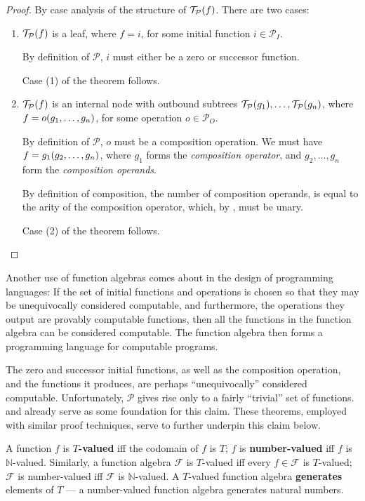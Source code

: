 \begin{proof} By case analysis of the structure of
$\mathcal{T}_\mathcal{P}{\mathopen{}\left({f}\right)\mathclose{}}$.  There are two
cases:\begin{enumerate}[label=(\arabic*)]

\item $\mathcal{T}_\mathcal{P}{\mathopen{}\left({f}\right)\mathclose{}}$ is a leaf, where $f=i$, for some initial
function $i \in \mathcal{P}_I$.

By definition of $\mathcal{P}$, $i$ must either be a zero or successor
function.

Case (1) of the theorem follows.

\item $\mathcal{T}_\mathcal{P}{\mathopen{}\left({f}\right)\mathclose{}}$ is an internal node with outbound subtrees
$\mathcal{T}_\mathcal{P}{\mathopen{}\left({g_1}\right)\mathclose{}}, \ldots, \mathcal{T}_\mathcal{P}{\mathopen{}\left({g_n}\right)\mathclose{}}$, where
$f = o{\mathopen{}\left({g_1, \ldots, g_n}\right)\mathclose{}}$, for some operation $o \in \mathcal{P}_O$.

By definition of $\mathcal{P}$, $o$ must be a composition operation. We must
have $f = g_1{\mathopen{}\left({g_2, \ldots, g_n}\right)\mathclose{}}$, where $g_1$ forms the \emph{composition
operator}, and $g_2, \ldots, g_n$ form the \emph{composition operands}.

By definition of composition, the number of composition operands, is equal to
the arity of the composition operator, which, by ,
must be unary.

Case (2) of the theorem follows.\end{enumerate}\end{proof}

Another use of function algebras comes about in the design of programming
languages: If the set of initial functions and operations is chosen so that
they may be unequivocally considered computable, and furthermore, the
operations they output are provably computable functions, then all the
functions in the function algebra can be considered computable. The function
algebra then forms a programming language for computable programs.

The zero and successor initial functions, as well as the composition operation,
and the functions it produces, are perhaps ``unequivocally'' considered
computable. Unfortunately, $\mathcal{P}$ gives rise only to a fairly
``trivial'' set of functions.   and
 already serve as some foundation for this claim.
These theorems, employed with similar proof techniques, serve to further
underpin this claim below.

\begin{definition} A function $f$ is \textbf{$T$-valued} iff the codomain of
$f$ is $T$; $f$ is \textbf{number-valued} iff $f$ is $\mathbb{N}$-valued.
Similarly, a function algebra $\mathcal{F}$ is $T$-valued iff every $f \in
\mathcal{F}$ is $T$-valued; $\mathcal{F}$ is number-valued iff $\mathcal{F}$ is
$\mathbb{N}$-valued. A $T$-valued function algebra \textbf{generates} elements
of $T$ --- a number-valued function algebra generates natural numbers.
 
 \end{definition}

